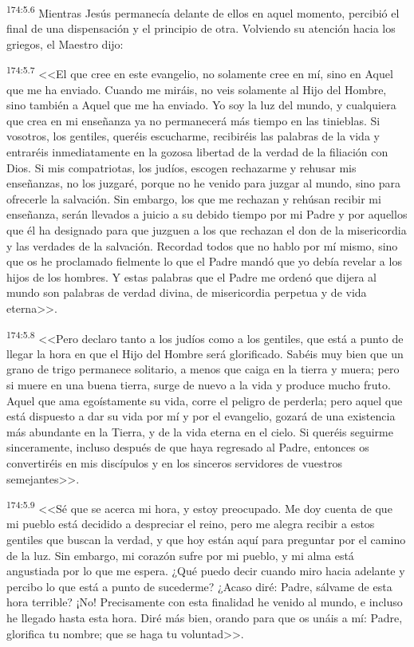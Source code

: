 \par 
\textsuperscript{174:5.6} Mientras Jesús permanecía delante de ellos en aquel momento, percibió el final de una dispensación y el principio de otra. Volviendo su atención hacia los griegos, el Maestro dijo:

\par 
\textsuperscript{174:5.7} <<El que cree en este evangelio, no solamente cree en mí, sino en Aquel que me ha enviado. Cuando me miráis, no veis solamente al Hijo del Hombre, sino también a Aquel que me ha enviado. Yo soy la luz del mundo, y cualquiera que crea en mi enseñanza ya no permanecerá más tiempo en las tinieblas. Si vosotros, los gentiles, queréis escucharme, recibiréis las palabras de la vida y entraréis inmediatamente en la gozosa libertad de la verdad de la filiación con Dios. Si mis compatriotas, los judíos, escogen rechazarme y rehusar mis enseñanzas, no los juzgaré, porque no he venido para juzgar al mundo, sino para ofrecerle la salvación. Sin embargo, los que me rechazan y rehúsan recibir mi enseñanza, serán llevados a juicio a su debido tiempo por mi Padre y por aquellos que él ha designado para que juzguen a los que rechazan el don de la misericordia y las verdades de la salvación. Recordad todos que no hablo por mí mismo, sino que os he proclamado fielmente lo que el Padre mandó que yo debía revelar a los hijos de los hombres. Y estas palabras que el Padre me ordenó que dijera al mundo son palabras de verdad divina, de misericordia perpetua y de vida eterna>>.

\par 
\textsuperscript{174:5.8} <<Pero declaro tanto a los judíos como a los gentiles, que está a punto de llegar la hora en que el Hijo del Hombre será glorificado. Sabéis muy bien que un grano de trigo permanece solitario, a menos que caiga en la tierra y muera; pero si muere en una buena tierra, surge de nuevo a la vida y produce mucho fruto. Aquel que ama egoístamente su vida, corre el peligro de perderla; pero aquel que está dispuesto a dar su vida por mí y por el evangelio, gozará de una existencia más abundante en la Tierra, y de la vida eterna en el cielo. Si queréis seguirme sinceramente, incluso después de que haya regresado al Padre, entonces os convertiréis en mis discípulos y en los sinceros servidores de vuestros semejantes>>.

\par 
\textsuperscript{174:5.9} <<Sé que se acerca mi hora, y estoy preocupado. Me doy cuenta de que mi pueblo está decidido a despreciar el reino, pero me alegra recibir a estos gentiles que buscan la verdad, y que hoy están aquí para preguntar por el camino de la luz. Sin embargo, mi corazón sufre por mi pueblo, y mi alma está angustiada por lo que me espera. ¿Qué puedo decir cuando miro hacia adelante y percibo lo que está a punto de sucederme? ¿Acaso diré: Padre, sálvame de esta hora terrible? ¡No! Precisamente con esta finalidad he venido al mundo, e incluso he llegado hasta esta hora. Diré más bien, orando para que os unáis a mí: Padre, glorifica tu nombre; que se haga tu voluntad>>.

